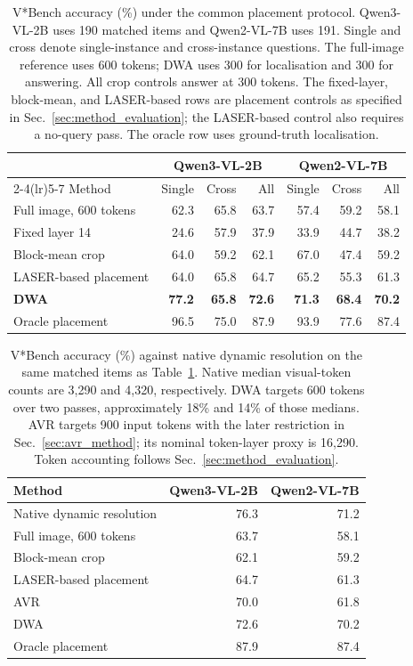 \documentclass{article} %
\begin{document}
\begin{table}[tb]
\centering\small
\caption{V*Bench accuracy (\%) under the common placement protocol.
Qwen3-VL-2B uses 190 matched items and Qwen2-VL-7B uses 191.
Single and cross denote single-instance and cross-instance questions.
The full-image reference uses 600 tokens; DWA uses 300 for localisation
and 300 for answering. All crop controls answer at 300 tokens. The fixed-layer,
block-mean, and LASER-based rows are placement controls as specified in
Sec.~\ref{sec:method_evaluation}; the LASER-based control also requires
a no-query pass. The oracle row uses ground-truth localisation.}
\label{tab:main_results}
\setlength{\tabcolsep}{5pt}
\begin{tabular}{lrrrrrr}
\toprule
& \multicolumn{3}{c}{Qwen3-VL-2B} & \multicolumn{3}{c}{Qwen2-VL-7B} \\
\cmidrule(lr){2-4}\cmidrule(lr){5-7}
Method & Single & Cross & All & Single & Cross & All \\
\midrule
Full image, 600 tokens & 62.3 & 65.8 & 63.7 & 57.4 & 59.2 & 58.1 \\
Fixed layer 14 & 24.6 & 57.9 & 37.9 & 33.9 & 44.7 & 38.2 \\
Block-mean crop & 64.0 & 59.2 & 62.1 & 67.0 & 47.4 & 59.2 \\
LASER-based placement & 64.0 & 65.8 & 64.7 & 65.2 & 55.3 & 61.3 \\
\textbf{DWA} & \textbf{77.2} & \textbf{65.8} & \textbf{72.6} & \textbf{71.3} & \textbf{68.4} & \textbf{70.2} \\
\midrule
Oracle placement & 96.5 & 75.0 & 87.9 & 93.9 & 77.6 & 87.4 \\
\bottomrule
\end{tabular}
\end{table}


\begin{table}[tb]
\centering\small
\caption{V*Bench accuracy (\%) against native dynamic resolution on the
same matched items as Table~\ref{tab:main_results}. Native median
visual-token counts are 3,290 and 4,320, respectively. DWA targets
600 tokens over two passes, approximately 18\% and 14\% of those
medians. AVR targets 900 input tokens with the later restriction in
Sec.~\ref{sec:avr_method}; its nominal token-layer proxy is 16,290.
Token accounting follows Sec.~\ref{sec:method_evaluation}.}
\label{tab:native_results}
\begin{tabular}{lrr}
\toprule
Method & Qwen3-VL-2B & Qwen2-VL-7B \\
\midrule
Native dynamic resolution & 76.3 & 71.2 \\
Full image, 600 tokens & 63.7 & 58.1 \\
Block-mean crop & 62.1 & 59.2 \\
LASER-based placement & 64.7 & 61.3 \\
AVR & 70.0 & 61.8 \\
DWA & 72.6 & 70.2 \\
Oracle placement & 87.9 & 87.4 \\
\bottomrule
\end{tabular}
\end{table}
\end{document}
